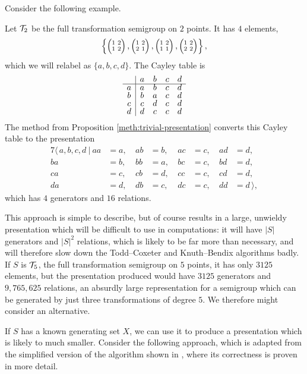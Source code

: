 Consider the following example.

\begin{example}
  Let $\mathcal{T}_2$ be the full transformation semigroup on $2$ points.  It has $4$
  elements,
  $$\left\{\transII 12, \transII 21, \transII 11, \transII 22\right\},$$
  which we will relabel as $\{a,b,c,d\}$.  The Cayley table is
  $$
  \begin{array}{c | c c c c}
    & a & b & c & d \\
    \hline
    a & a & b & c & d \\
    b & b & a & c & d \\
    c & c & d & c & d \\
    d & d & c & c & d \\
  \end{array}
  $$
  The method from Proposition \ref{meth:trivial-presentation} converts this
  Cayley table to the presentation
  \begin{alignat*}{7}
    \langle\, a,b,c,d ~|~
    aa&=a,\ & ab&=b,\ & ac&=c,\ & ad&=d, \\
    ba&=b,\ & bb&=a,\ & bc&=c,\ & bd&=d, \\
    ca&=c,\ & cb&=d,\ & cc&=c,\ & cd&=d, \\
    da&=d,\ & db&=c,\ & dc&=c,\ & dd&=d\,\rangle,
  \end{alignat*}
  which has $4$ generators and $16$ relations.
\end{example}

This approach is simple to describe, but of course results in a large, unwieldy
presentation which will be difficult to use in computations: it will have $|S|$
generators and $|S|^2$ relations, which is likely to be far more than necessary,
and will therefore slow down the Todd--Coxeter and Knuth--Bendix algorithms badly.
If $S$ is $\mathcal{T}_5$, the full transformation semigroup on $5$ points, it has only
$3125$ elements, but the presentation produced would have $3125$ generators and
$9,765,625$ relations, an absurdly large representation for a semigroup which
can be generated by just three transformations of degree $5$.  We
therefore might consider an alternative.


If $S$ has a known generating set $X$, we can use it to produce a presentation
which is likely to much smaller.  Consider the following approach, which is
adapted from the simplified version of the algorithm shown in
\cite[\S 3.1]{froidure_pin}, where its correctness is proven in more detail.

